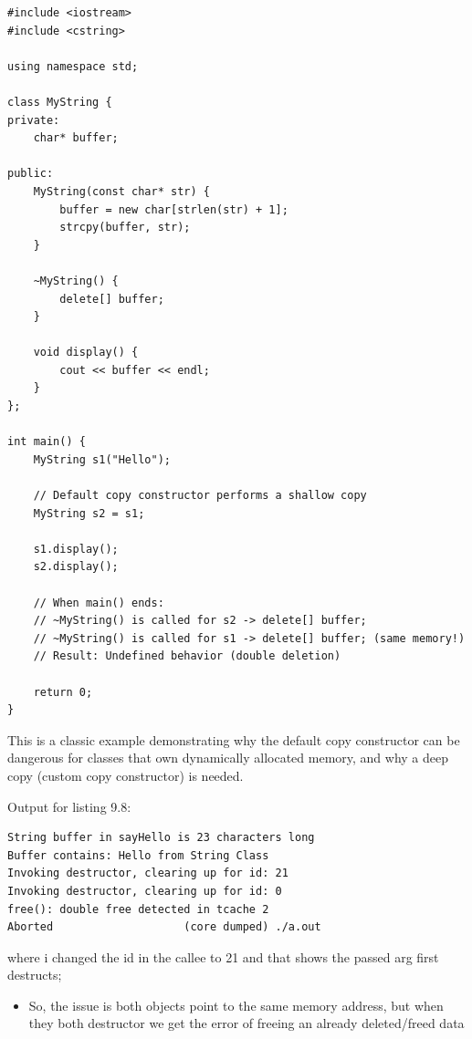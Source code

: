 \documentclass[10pt]{article}
\newcommand{\pbreak}{\vspace{30pt}}
\begin{document}
\begin{verbatim}
#include <iostream>
#include <cstring>

using namespace std;

class MyString {
private:
    char* buffer;

public:
    MyString(const char* str) {
        buffer = new char[strlen(str) + 1];
        strcpy(buffer, str);
    }

    ~MyString() {
        delete[] buffer;
    }

    void display() {
        cout << buffer << endl;
    }
};

int main() {
    MyString s1("Hello");

    // Default copy constructor performs a shallow copy
    MyString s2 = s1;

    s1.display();
    s2.display();

    // When main() ends:
    // ~MyString() is called for s2 -> delete[] buffer;
    // ~MyString() is called for s1 -> delete[] buffer; (same memory!)
    // Result: Undefined behavior (double deletion)

    return 0;
}
\end{verbatim}

	This is a classic example demonstrating why the default copy constructor can be dangerous for classes that own dynamically allocated memory, and why a deep copy (custom copy constructor) is needed.

	\pbreak

	Output for listing 9.8:
	\begin{verbatim}
String buffer in sayHello is 23 characters long
Buffer contains: Hello from String Class
Invoking destructor, clearing up for id: 21
Invoking destructor, clearing up for id: 0
free(): double free detected in tcache 2
Aborted                    (core dumped) ./a.out
	\end{verbatim}

	where i changed the id in the callee to 21 and that shows the passed arg first destructs;

	\begin{itemize}
		\item So, the issue is both objects point to the same memory address, but when they both destructor we get the error of freeing an already deleted/freed data
	\end{itemize}

\newpage
\end{document}
